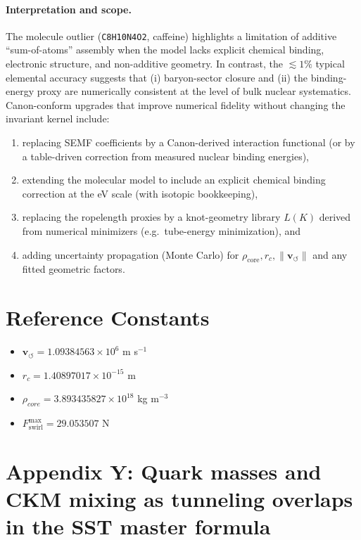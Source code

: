 \documentclass[10pt]{article}
\newcommand{\rhocore}{\rho_{core}}
\begin{document}
\paragraph{Interpretation and scope.}
The molecule outlier (\texttt{C8H10N4O2}, caffeine) highlights a limitation of additive ``sum-of-atoms'' assembly when the model lacks explicit chemical binding, electronic structure, and non-additive geometry. In contrast, the \(\lesssim 1\%\) typical elemental accuracy suggests that (i) baryon-sector closure and (ii) the binding-energy proxy are numerically consistent at the level of bulk nuclear systematics. Canon-conform upgrades that improve numerical fidelity without changing the invariant kernel include:
\begin{enumerate}
    \item replacing SEMF coefficients by a Canon-derived interaction functional (or by a table-driven correction from measured nuclear binding energies),
    \item extending the molecular model to include an explicit chemical binding correction at the eV scale (with isotopic bookkeeping),
    \item replacing the ropelength proxies by a knot-geometry library \(L(K)\) derived from numerical minimizers (e.g.\ tube-energy minimization), and
    \item adding uncertainty propagation (Monte Carlo) for \(\rho_{\text{core}}, r_c,\lVert \mathbf{v}_{\!\boldsymbol{\circlearrowleft}}\rVert\) and any fitted geometric factors.
\end{enumerate}

    \section{Reference Constants}
    \begin{itemize}
        \item $\mathbf{v}_{\circlearrowleft} = 1.09384563 \times 10^6$ m s$^{-1}$
        \item $r_c = 1.40897017 \times 10^{-15}$ m
        \item $\rhocore = 3.893435827 \times 10^{18}$ kg m$^{-3}$
        \item $F_{\text{swirl}}^{\max} = 29.053507$ N
    \end{itemize}

    \section*{Appendix Y: Quark masses and CKM mixing as tunneling overlaps in the SST master formula}
\end{document}
